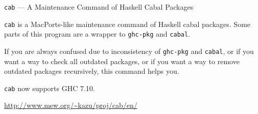 \begin{hcarentry}[updated]{{\tt cab} --- A Maintenance Command of Haskell Cabal Packages}
\makeheader

{\tt cab} is a MacPorts-like maintenance command of Haskell cabal packages. Some parts of this program are a wrapper to {\tt ghc-pkg} and {\tt cabal}.

If you are always confused due to inconsistency of {\tt ghc-pkg} and {\tt cabal}, or if you want a way to check all outdated packages, or if you want a way to remove outdated packages recursively, this command helps you.

{\tt cab} now supports GHC 7.10.

\FurtherReading
  \url{http://www.mew.org/~kazu/proj/cab/en/}
\end{hcarentry}
